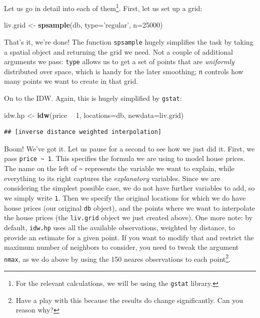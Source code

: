 \documentclass[]{book}
\newenvironment{Shaded}{\begin{snugshade}}{\end{snugshade}}
\newcommand{\KeywordTok}[1]{\textcolor[rgb]{0.13,0.29,0.53}{\textbf{#1}}}
\newcommand{\DataTypeTok}[1]{\textcolor[rgb]{0.13,0.29,0.53}{#1}}
\newcommand{\DecValTok}[1]{\textcolor[rgb]{0.00,0.00,0.81}{#1}}
\newcommand{\StringTok}[1]{\textcolor[rgb]{0.31,0.60,0.02}{#1}}
\newcommand{\OperatorTok}[1]{\textcolor[rgb]{0.81,0.36,0.00}{\textbf{#1}}}
\newcommand{\NormalTok}[1]{#1}
\begin{document}
Let us go in detail into each of them\footnote{For the relevant
  calculations, we will be using the \texttt{gstat} library.}. First,
let us set up a grid:

\begin{Shaded}
\begin{Highlighting}[]
\NormalTok{liv.grid <-}\StringTok{ }\KeywordTok{spsample}\NormalTok{(db, }\DataTypeTok{type=}\StringTok{'regular'}\NormalTok{, }\DataTypeTok{n=}\DecValTok{25000}\NormalTok{)}
\end{Highlighting}
\end{Shaded}

That's it, we're done! The function \texttt{spsample} hugely simplifies
the task by taking a spatial object and returning the grid we need. Not
a couple of additional arguments we pass: \texttt{type} allows us to get
a set of points that are \emph{uniformly} distributed over space, which
is handy for the later smoothing; \texttt{n} controls how many points we
want to create in that grid.

On to the IDW. Again, this is hugely simplified by \texttt{gstat}:

\begin{Shaded}
\begin{Highlighting}[]
\NormalTok{idw.hp <-}\StringTok{ }\KeywordTok{idw}\NormalTok{(price }\OperatorTok{~}\StringTok{ }\DecValTok{1}\NormalTok{, }\DataTypeTok{locations=}\NormalTok{db, }\DataTypeTok{newdata=}\NormalTok{liv.grid)}
\end{Highlighting}
\end{Shaded}

\begin{verbatim}
## [inverse distance weighted interpolation]
\end{verbatim}

Boom! We've got it. Let us pause for a second to see how we just did it.
First, we pass \texttt{price\ \textasciitilde{}\ 1}. This specifies the
formula we are using to model house prices. The name on the left of
\texttt{\textasciitilde{}} represents the variable we want to explain,
while everything to its right captures the \emph{explanatory} variables.
Since we are considering the simplest possible case, we do not have
further variables to add, so we simply write \texttt{1}. Then we specify
the original locations for which we do have house prices (our original
\texttt{db} object), and the points where we want to interpolate the
house prices (the \texttt{liv.grid} object we just created above). One
more note: by default, \texttt{idw.hp} uses all the available
observations, weighted by distance, to provide an estimate for a given
point. If you want to modify that and restrict the maximum number of
neighbors to consider, you need to tweak the argument \texttt{nmax}, as
we do above by using the 150 neares observations to each point\footnote{Have
  a play with this because the results do change significantly. Can you
  reason why?}.
\end{document}
